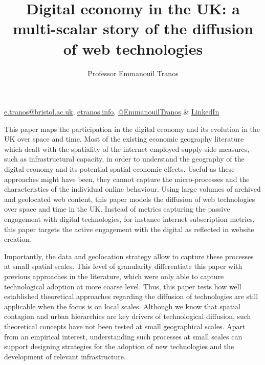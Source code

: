 \documentclass[11pt]{article}
\begin{document}

\author[]{Professor Emmanouil Tranos}

\title{Digital economy in the UK: a multi-scalar story of the diffusion of web technologies}
\maketitle

\begin{center}
\href{mailto:e.tranos@bristol.ac.uk}{e.tranos@bristol.ac.uk},
\href{https://etranos.info/}{etranos.info},
\href{https://twitter.com/EmmanouilTranos}{@EmmanouilTranos} \&
\href{https://www.linkedin.com/in/emmanouil-tranos-42947812a/}{LinkedIn}
\end{center}


\medskip

This paper maps the participation in the digital economy and its evolution in the UK over space and time. Most of the existing economic geography literature which dealt with the spatiality of the internet employed supply-side measures, such as infrastructural capacity, in order to understand the geography of the digital economy and its potential spatial economic effects. Useful as these approaches might have been, they cannot capture the micro-processes and the characteristics of the individual online behaviour. Using large volumes of archived and geolocated web content, this paper models the diffusion of web technologies over space and time in the UK. Instead of metrics capturing the passive engagement with digital technologies, for instance internet subscription metrics, this paper targets the active engagement with the digital as reflected in website creation. 

Importantly, the data and geolocation strategy allow to capture these processes at small spatial scales. This level of granularity differentiate this paper with previous approaches in the literature, which were only able to capture technological adoption at more coarse level. Thus, this paper tests how well established theoretical approaches regarding the diffusion of technologies are still applicable when the focus is on local scales. Although we know that spatial contagion and urban hierarchies are key drivers of technological diffusion, such theoretical concepts have not been tested at small geographical scales. Apart from an empirical interest, understanding such processes at small scales can support designing strategies for the adoption of new technologies and the development of relevant infrastructure. 
\end{document}
